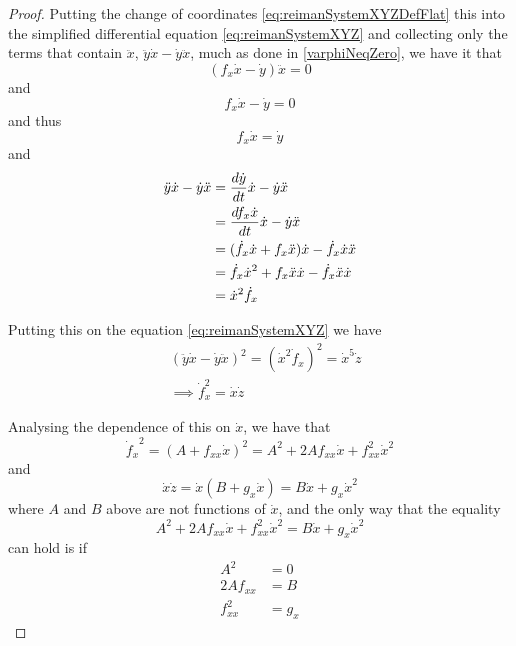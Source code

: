 \documentclass[12pt]{article}
\begin{document}
\begin{lemma}
  \label{fDepOnlyX}
\end{lemma}
\begin{proof}
Putting the change of coordinates \eqref{eq:reimanSystemXYZDefFlat} this into the simplified 
differential equation  \eqref{eq:reimanSystemXYZ} and collecting only the terms that contain 
$\ddot{x}$, $\ddot{y}\dot{x} - \dot{y}\ddot{x}$, much as done in \ref{varphiNeqZero},  we have it that
\[ (f_x \dot{x} - \dot{y}) \ddot{x} = 0 \]
and
\[ f_x \dot{x} - \dot{y} = 0 \]
and thus
\[ f_x \dot{x} = \dot{y} \]
and
\begin{align*}
  \ddot{y}\dot{x} - \dot{y}\ddot{x}
  &= \frac{d\dot{y}}{dt}\dot{x} - \dot{y}\ddot{x} \\
  &= \frac{df_x \dot{x}}{dt}\dot{x} - \dot{y}\ddot{x} \\
  &= ( \dot{f}_x \dot{x} + f_x \ddot{x} )\dot{x} - \dot{f}_x \dot{x} \ddot{x} \\
  &= \dot{f}_x \dot{x}^2 + f_x \ddot{x} \dot{x} - \dot{f}_x \ddot{x} \dot{x} \\
  &= \dot{x}^2 \dot{f}_x \\
\end{align*}

Putting this on the equation \eqref{eq:reimanSystemXYZ} we have
\begin{align*}
  &(\ddot{y}\dot{x} - \dot{y}\ddot{x})^2
  = (\dot{x}^2 \dot{f}_x)^2
  = \dot{x}^5 \dot{z} \\
  &\implies
  \dot{f}_x^2 = \dot{x} \dot{z}
\end{align*}

Analysing the dependence of this on $\dot{x}$, we have that
\begin{equation}
 {\dot{f}_{x}}^2 = (A + f_{xx}\dot{x})^2 = A^2 + 2Af_{xx}\dot{x} + {f}_{xx}^2\dot{x}^2
\end{equation}
and
\begin{equation}
  \dot{x} \dot{z} = \dot{x} ( B + g_x \dot{x} ) = B \dot{x} + g_x \dot{x}^2
\end{equation}
where $A$ and $B$ above are not functions of $\dot{x}$, and the only way that the equality \label{TODO16}
\begin{equation}
  A^2 + 2Af_{xx}\dot{x} + {f}_{xx}^2\dot{x}^2 = B \dot{x} + g_x \dot{x}^2
\end{equation}
can hold is if
\begin{align}
  A^2 &= 0 \\
  2Af_{xx} &= B \\
  f_{xx}^2 &= g_x
\end{align}


\end{proof}
\end{document}
